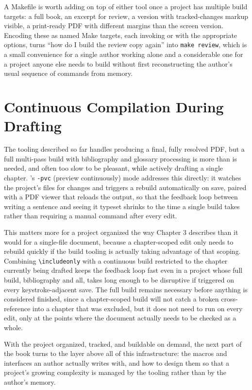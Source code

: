 A Makefile is worth adding on top of either tool once a project has multiple build targets: a full book, an excerpt for review, a version with tracked-changes markup visible, a print-ready PDF with different margins than the screen version. Encoding these as named Make targets, each invoking  or  with the appropriate options, turns ``how do I build the review copy again'' into \texttt{make\ review}, which is a small convenience for a single author working alone and a considerable one for a project anyone else needs to build without first reconstructing the author's usual sequence of commands from memory.

\hypertarget{continuous-compilation-during-drafting}{%
\section{Continuous Compilation During Drafting}\label{continuous-compilation-during-drafting}}

The tooling described so far handles producing a final, fully resolved PDF, but a full multi-pass build with bibliography and glossary processing is more than is needed, and often too slow to be pleasant, while actively drafting a single chapter. 's \texttt{-pvc} (preview continuously) mode addresses this directly: it watches the project's files for changes and triggers a rebuild automatically on save, paired with a PDF viewer that reloads the output, so that the feedback loop between writing a sentence and seeing it typeset shrinks to the time a single build takes rather than requiring a manual command after every edit.

This matters more for a project organized the way Chapter 3 describes than it would for a single-file document, because a chapter-scoped edit only needs to rebuild quickly if the build tooling is actually taking advantage of that scoping. Combining \texttt{\textbackslash{}includeonly} with a continuous build restricted to the chapter currently being drafted keeps the feedback loop fast even in a project whose full build, bibliography and all, takes long enough to be disruptive if triggered on every keystroke-adjacent save. The full build remains necessary before anything is considered finished, since a chapter-scoped build will not catch a broken cross-reference into a chapter that was excluded, but it does not need to run on every edit, only at the points where the document actually needs to be checked as a whole.

With the project organized, tracked, and buildable on demand, the next part of the book turns to the layer above all of this infrastructure: the macros and interfaces an author actually writes with, and how to design them so that a project's growing complexity is managed by the tooling rather than by the author's memory.
